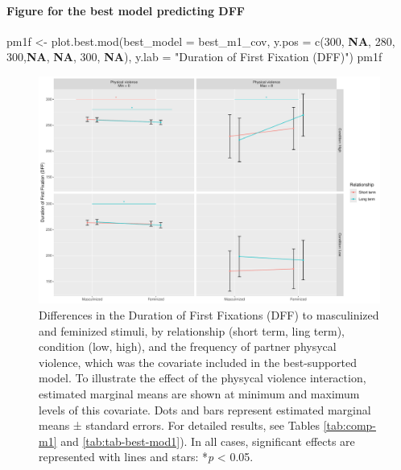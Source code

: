 \documentclass[
  bookmarksnumbered]{article}
\newenvironment{Shaded}{\begin{snugshade}}{\end{snugshade}}
\newcommand{\AttributeTok}[1]{\textcolor[rgb]{0.80,0.80,0.80}{#1}}
\newcommand{\ConstantTok}[1]{\textcolor[rgb]{0.86,0.64,0.64}{\textbf{#1}}}
\newcommand{\DecValTok}[1]{\textcolor[rgb]{0.86,0.86,0.80}{#1}}
\newcommand{\FunctionTok}[1]{\textcolor[rgb]{0.94,0.94,0.56}{#1}}
\newcommand{\NormalTok}[1]{\textcolor[rgb]{0.80,0.80,0.80}{#1}}
\newcommand{\OtherTok}[1]{\textcolor[rgb]{0.94,0.94,0.56}{#1}}
\newcommand{\StringTok}[1]{\textcolor[rgb]{0.80,0.58,0.58}{#1}}
\begin{document}
\paragraph{Figure for the best model predicting DFF}\label{figure-for-the-best-model-predicting-dff}

\begin{Shaded}
\begin{Highlighting}[]
\NormalTok{pm1f }\OtherTok{\textless{}{-}} \FunctionTok{plot.best.mod}\NormalTok{(}\AttributeTok{best\_model =}\NormalTok{ best\_m1\_cov, }
                      \AttributeTok{y.pos =} \FunctionTok{c}\NormalTok{(}\DecValTok{300}\NormalTok{, }\ConstantTok{NA}\NormalTok{, }\DecValTok{280}\NormalTok{, }\DecValTok{300}\NormalTok{,}\ConstantTok{NA}\NormalTok{, }\ConstantTok{NA}\NormalTok{, }\DecValTok{300}\NormalTok{, }\ConstantTok{NA}\NormalTok{),}
                      \AttributeTok{y.lab =} \StringTok{"Duration of First Fixation (DFF)"}\NormalTok{)}
\NormalTok{pm1f}
\end{Highlighting}
\end{Shaded}

\begin{figure}
\centering
\includegraphics{Supplementary_material_files/figure-latex/fig-mod1-cov-1.pdf}
\caption{\label{fig:fig-mod1-cov}Differences in the Duration of First Fixations (DFF) to masculinized and feminized stimuli, by relationship (short term, ling term), condition (low, high), and the frequency of partner physycal violence, which was the covariate included in the best-supported model. To illustrate the effect of the physycal violence interaction, estimated marginal means are shown at minimum and maximum levels of this covariate. Dots and bars represent estimated marginal means ± standard errors. For detailed results, see Tables \ref{tab:comp-m1} and \ref{tab:tab-best-mod1}). In all cases, significant effects are represented with lines and stars: *\emph{p} \textless{} 0.05.}
\end{figure}
\end{document}
